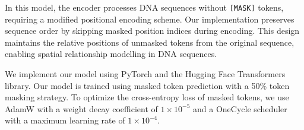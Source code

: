 In this model, the encoder processes DNA sequences without \texttt{[MASK]} tokens, requiring a modified positional encoding scheme. Our implementation preserves sequence order by skipping masked position indices during encoding. This design maintains the relative positions of unmasked tokens from the original sequence, enabling spatial relationship modelling in DNA sequences.

We implement our model using PyTorch and the Hugging Face Transformers library. Our model is trained using masked token prediction with a 50\% token masking strategy.  To optimize the cross-entropy loss of masked tokens, we use AdamW \citep{AdamW} with a weight decay coefficient of $1\times10^{-5}$ and a OneCycle scheduler with a maximum learning rate of $1 \times 10^{-4}$.